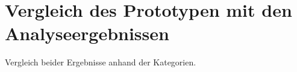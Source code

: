\section{Vergleich des Prototypen mit den Analyseergebnissen}
\label{sec:comparison}
Vergleich beider Ergebnisse anhand der Kategorien.
